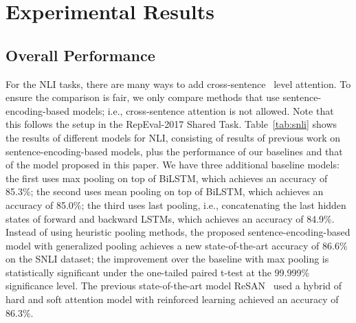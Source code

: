 \documentclass[11pt]{article}
\begin{document}
\section{Experimental Results}
\subsection{Overall Performance}
For the NLI tasks, there are many ways to add cross-sentence~\cite{DBLP:journals/corr/RocktaschelGHKB15,DBLP:conf/emnlp/ParikhT0U16,DBLP:conf/acl/ChenZLWJI17} level attention. To ensure the comparison is fair, we only compare methods that use sentence-encoding-based models; i.e., cross-sentence attention is not allowed. Note that this follows the setup in the RepEval-2017 Shared Task. Table~\ref{tab:snli} shows the results of different models for NLI, consisting of results of previous work on sentence-encoding-based models, plus the performance of our baselines and that of the model proposed in this paper. We have three additional baseline models: the first uses max pooling on top of BiLSTM, which achieves an accuracy of 85.3\%; the second uses mean pooling on top of BiLSTM, which achieves an accuracy of 85.0\%; the third uses last pooling, i.e., concatenating the last hidden states of forward and backward LSTMs, which achieves an accuracy of 84.9\%. Instead of using heuristic pooling methods, the proposed sentence-encoding-based model with generalized pooling achieves a new state-of-the-art accuracy of 86.6\% on the SNLI dataset; the improvement over the baseline with max pooling is statistically significant under the one-tailed paired t-test at the 99.999\% significance level. The previous state-of-the-art model ReSAN~\cite{DBLP:journals/corr/abs-1801-10296} used a hybrid of hard and soft attention model with reinforced learning achieved an accuracy of 86.3\%.  
\end{document}
